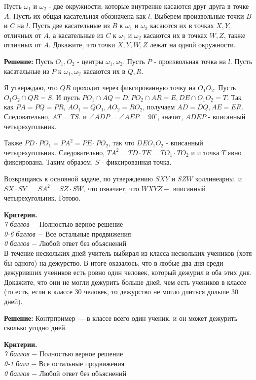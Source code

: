 Пусть $\omega_1$ и $\omega_2$ - две окружности, которые внутренне касаются друг друга в точке $A$. Пусть их общая касательная обозначена как $l$. Выберем произвольные точки $B$ и $C$ на $l$. Пусть две касательные из $B$ к $\omega_1$ и $\omega_2$ касаются их в точках $X, Y$, отличных от $A$, а касательные из $C$ к $\omega_1$ и $\omega_2$ касаются их в точках $W, Z$, также отличных от $A$. Докажите, что точки $X, Y, W, Z$ лежат на одной окружности.

\textbf{Решение:} Пусть $O_1, O_2$ - центры $\omega_1, \omega_2$. Пусть $P$ - произвольная точка на $l$. Пусть касательные из $P$ к $\omega_1, \omega_2$ касаются их в $Q, R$.

Я утверждаю, что $Q R$ проходит через фиксированную точку на $O_1 O_2$. Пусть $O_1 O_2 \cap Q R=S$. И пусть $P O_1 \cap A Q=D, P O_2 \cap A R=E, D E \cap O_1 O_2=T$. Так как $P A=P Q=P R$, $A O_1=Q O_1, A O_2=R O_2$, получаем $A D=D Q, A E=E R$. Следовательно, $A T=T S$. и $\angle A D P=\angle A E P=90^{\circ}$, значит, $A D E P$ - вписанный четырехугольник.

Также $P D \cdot P O_1=P A^2=P E \cdot P O_2$, так что $D E O_1 O_2$ - вписанный четырехугольник.
Следовательно, $T A^2=T D \cdot T E=T O_1 \cdot T O_2$ и и точка $T$ явно фиксирована. Таким образом, $S$ - фиксированная точка.

Возвращаясь к основной задаче, по утверждению $S X Y$ и $S Z W$ коллинеарны. и $S X \cdot S Y=$ $S A^2=S Z \cdot S W$, что означает, что $W X Y Z-$ вписанный четырехугольник. Готово.

\textbf{Критерии.} \\
\textit{7 баллов} $-$ Полностью верное решение\\
\textit{0-6 баллов} $-$ Все остальные продвижения\\
\textit{0 баллов} $-$ Любой ответ без объяснений\\

В течение нескольких дней учитель выбирал из класса нескольких учеников (хотя бы одного) на дежурство. В итоге оказалось, что в любые два дня среди дежуривших учеников есть ровно один человек, который дежурил в оба этих дня. Докажите, что они не могли дежурить больше дней, чем есть учеников в классе (то есть, если в классе 30 человек, то дежурство не могло длиться дольше 30 дней).

\textbf{Решение:} Контрпример --- в классе всего один ученик, и он может дежурить сколько угодно  дней.

\textbf{Критерии.} \\
\textit{7 баллов} $-$ Полностью верное решение\\
\textit{0-1 балл} $-$ Все остальные продвижения\\
\textit{0 баллов} $-$ Любой ответ без объяснений\\